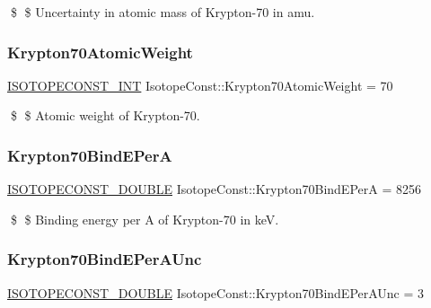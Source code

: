 \$ \$ Uncertainty in atomic mass of Krypton-\/70 in amu. \mbox{\label{group___isotope_const-_krypton-_kr70_gac80699e8606b7a61dbf0a90df64c3f9e}} 
\subsubsection{\texorpdfstring{Krypton70\+Atomic\+Weight}{Krypton70AtomicWeight}}
{\footnotesize\ttfamily \mbox{\hyperlink{group___isotope_const-_macros_ga5f18360b3e99483a35c32d789e62621c}{I\+S\+O\+T\+O\+P\+E\+C\+O\+N\+S\+T\+\_\+\+I\+NT}} Isotope\+Const\+::\+Krypton70\+Atomic\+Weight = 70}

\$ \$ Atomic weight of Krypton-\/70. \mbox{\label{group___isotope_const-_krypton-_kr70_gae5a4e7a41dc231b295efecbd93c1adcc}} 
\subsubsection{\texorpdfstring{Krypton70\+Bind\+E\+PerA}{Krypton70BindEPerA}}
{\footnotesize\ttfamily \mbox{\hyperlink{group___isotope_const-_macros_ga8f45a7272ce02c0b4c65c44636ed719a}{I\+S\+O\+T\+O\+P\+E\+C\+O\+N\+S\+T\+\_\+\+D\+O\+U\+B\+LE}} Isotope\+Const\+::\+Krypton70\+Bind\+E\+PerA = 8256}

\$ \$ Binding energy per A of Krypton-\/70 in keV. \mbox{\label{group___isotope_const-_krypton-_kr70_gab164ee47d43d474394b5806d64e80da6}} 
\subsubsection{\texorpdfstring{Krypton70\+Bind\+E\+Per\+A\+Unc}{Krypton70BindEPerAUnc}}
{\footnotesize\ttfamily \mbox{\hyperlink{group___isotope_const-_macros_ga8f45a7272ce02c0b4c65c44636ed719a}{I\+S\+O\+T\+O\+P\+E\+C\+O\+N\+S\+T\+\_\+\+D\+O\+U\+B\+LE}} Isotope\+Const\+::\+Krypton70\+Bind\+E\+Per\+A\+Unc = 3}

